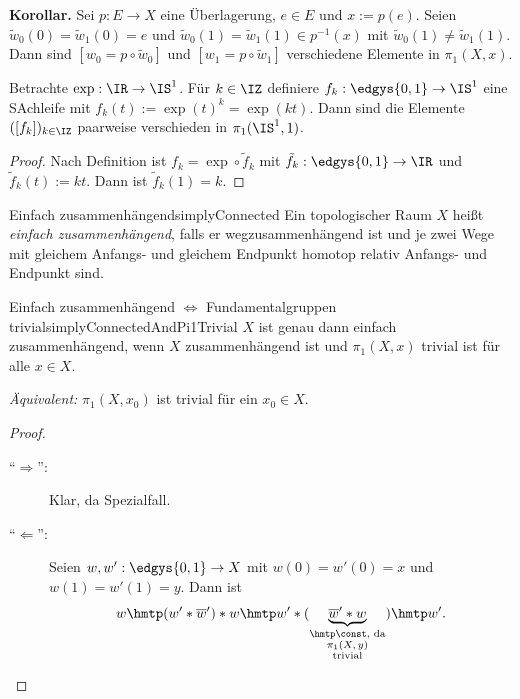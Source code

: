 \documentclass[language=ngerman]{TemplateLecture} %
\begin{document}



\textbf{Korollar.} Sei $p: E \to X$ eine Überlagerung, $e \in E$ und $x := p(e)$. Seien $\tilde{w}_0(0) = \tilde{w}_1(0) = e$ und $\tilde{w}_0(1) = \tilde{w}_1(1) \in p^{-1}(x)$ mit $\tilde{w}_0(1) \neq \tilde{w}_1(1)$. Dann sind $[w_0 = p \circ \tilde{w}_0]$ und $[w_1 = p \circ \tilde{w}_1]$ verschiedene Elemente in $\pi_1(X,x)$.

\begin{example}
    Betrachte $\exp: \IR \to \IS^1$. Für $k \in \IZ$ definiere $f_k: \edgys{0,1} \to \IS^1$ eine SAchleife mit $f_k(t) := \exp(t)^k = \exp(kt)$. Dann sind die Elemente $([f_k])_{k \in \IZ}$ paarweise verschieden in $\pi_1(\IS^1, 1)$.

    \begin{proof}
        Nach Definition ist $f_k = \exp \circ \tilde{f}_k$ mit $\tilde{f}_k : \edgys{0,1} \to \IR$ und $\tilde{f}_k(t) := kt$. Dann ist $\tilde{f}_k(1) = k$.
    \end{proof}
\end{example}


\begin{defi}{Einfach zusammenhängend}{simplyConnected}
    Ein topologischer Raum $X$ heißt \emph{einfach zusammenhängend}, falls er wegzusammenhängend ist und je zwei Wege mit gleichem Anfangs- und gleichem Endpunkt homotop relativ Anfangs- und Endpunkt sind.
\end{defi}

\begin{lem}{Einfach zusammenhängend $\Leftrightarrow$ Fundamentalgruppen trivial}{simplyConnectedAndPi1Trivial}
    $X$ ist genau dann einfach zusammenhängend, wenn $X$ zusammenhängend ist und $\pi_1(X,x)$ trivial ist für alle $x \in X$.

    \textit{Äquivalent:} $\pi_1(X,x_0)$ ist trivial für ein $x_0 \in X$.
\end{lem}

\begin{proof}
    \begin{description}
        \item[\enquote{$\Rightarrow$}:] Klar, da Spezialfall.
        \item[\enquote{$\Leftarrow$}:] Seien $w, w': \edgys{0,1} \to X$ mit $w(0) = w'(0) = x$ und $w(1) = w'(1) = y$. Dann ist 
        \begin{equation*}
            w \hmtp (w' * \overline{w}') * w \hmtp w' * (\underset{\substack{\hmtp \const, \text{ da} \\ \text{$\pi_1(X,y)$} \\ \text{trivial}}}{\underbrace{\overline{w}' * w}}) \hmtp w'. 
        \end{equation*}
    \end{description}
\end{proof}
\end{document}
